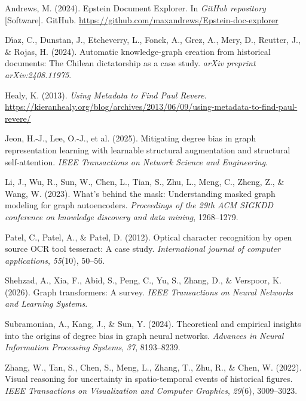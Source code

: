 \documentclass[
  italian,
  a4paper,
]{article}
\newlength{\cslhangindent}
\newenvironment{CSLReferences}[2] %
 {\begin{list}{}{%
  \setlength{\itemindent}{0pt}
  \setlength{\leftmargin}{0pt}
  \setlength{\parsep}{0pt}
  \ifodd #1
   \setlength{\leftmargin}{\cslhangindent}
   \setlength{\itemindent}{-1\cslhangindent}
  \fi
  \setlength{\itemsep}{#2\baselineskip}}}
 {\end{list}}
\begin{document}
\protect{}\label{refs}
\begin{CSLReferences}{1}{0}
Andrews, M. (2024). Epstein Document Explorer. In \emph{GitHub
repository} {[}Software{]}. GitHub.
\url{https://github.com/maxandrews/Epstein-doc-explorer}

Dı́az, C., Dunstan, J., Etcheverry, L., Fonck, A., Grez, A., Mery, D.,
Reutter, J., \& Rojas, H. (2024). Automatic knowledge-graph creation
from historical documents: The Chilean dictatorship as a case study.
\emph{arXiv preprint arXiv:2408.11975}.

Healy, K. (2013). \emph{Using Metadata to Find {Paul Revere}}.
\url{https://kieranhealy.org/blog/archives/2013/06/09/using-metadata-to-find-paul-revere/}

{Jeon, H.-J., Lee, O.-J., et al.} (2025). Mitigating degree bias in
graph representation learning with learnable structural augmentation and
structural self-attention. \emph{IEEE Transactions on Network Science
and Engineering}.

Li, J., Wu, R., Sun, W., Chen, L., Tian, S., Zhu, L., Meng, C., Zheng,
Z., \& Wang, W. (2023). What's behind the mask: Understanding masked
graph modeling for graph autoencoders. \emph{Proceedings of the 29th ACM
SIGKDD conference on knowledge discovery and data mining}, 1268--1279.

Patel, C., Patel, A., \& Patel, D. (2012). Optical character recognition
by open source OCR tool tesseract: A case study. \emph{International
journal of computer applications}, \emph{55}(10), 50--56.

Shehzad, A., Xia, F., Abid, S., Peng, C., Yu, S., Zhang, D., \&
Verspoor, K. (2026). Graph transformers: A survey. \emph{IEEE
Transactions on Neural Networks and Learning Systems}.

Subramonian, A., Kang, J., \& Sun, Y. (2024). Theoretical and empirical
insights into the origins of degree bias in graph neural networks.
\emph{Advances in Neural Information Processing Systems}, \emph{37},
8193--8239.

Zhang, W., Tan, S., Chen, S., Meng, L., Zhang, T., Zhu, R., \& Chen, W.
(2022). Visual reasoning for uncertainty in spatio-temporal events of
historical figures. \emph{IEEE Transactions on Visualization and
Computer Graphics}, \emph{29}(6), 3009--3023.

\end{CSLReferences}
\end{document}
